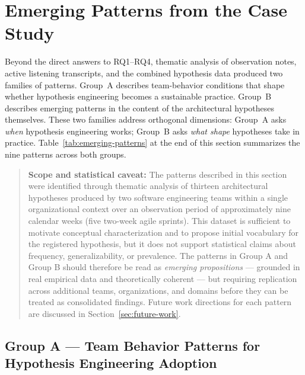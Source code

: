 \section{Emerging Patterns from the Case Study}
\label{sec:emerging-patterns}

Beyond the direct answers to RQ1–RQ4, thematic analysis of observation notes,
active listening transcripts, and the combined hypothesis data produced two
families of patterns. Group~A describes team-behavior conditions that shape
whether hypothesis engineering becomes a sustainable practice. Group~B describes 
emerging patterns in the content of the architectural hypotheses
themselves. These two families address orthogonal dimensions: Group~A asks
\textit{when} hypothesis engineering works; Group~B asks \textit{what shape}
hypotheses take in practice. Table~\ref{tab:emerging-patterns} at the end of
this section summarizes the nine patterns across both groups.

\begin{quote}
\textbf{Scope and statistical caveat:}
The patterns described in this section were identified through thematic analysis
of thirteen architectural hypotheses produced by two software engineering teams
within a single organizational context over an observation period of approximately nine calendar weeks (five two-week agile sprints).
This dataset is sufficient to motivate conceptual characterization and to propose
initial vocabulary for the registered hypothesis, but it does not support statistical
claims about frequency, generalizability, or prevalence.
The patterns in Group A and Group B should therefore be read as
\emph{emerging propositions} --- grounded in real empirical data and theoretically
coherent --- but requiring replication across additional teams, organizations, and
domains before they can be treated as consolidated findings.
Future work directions for each pattern are discussed in Section~\ref{sec:future-work}.
\end{quote}

\subsection{Group A — Team Behavior Patterns for Hypothesis Engineering
            Adoption}
\label{sec:group-a-patterns}


